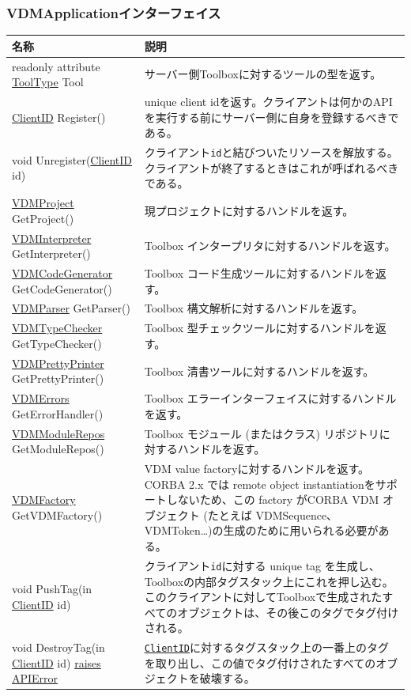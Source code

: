 \documentclass[\pformat,12pt]{jarticle}
\newcommand{\pbs}[1]{\let\temp=\\#1\let\\=\temp}
\newenvironment{interfacetable}{%
  \begin{longtable}{|>{\pbs\raggedright\ttfamily}p{6.6cm}%
                    |>{\pbs\raggedright}p{6.6cm}|} \hline
  \textrm{\bfseries 名称} &  \textbf{説明} \\ \hline
  \endhead
  }{\end{longtable}}
\newcommand{\APIError}{\hyperlink{exception.APIError}{raises APIError}}
\newcommand{\ToolType}{\hyperlink{type.ToolType}{ToolType}}
\newcommand{\VDMCodeGenerator}{\hyperlink{interface.VDMCodeGenerator}{VDMCodeGenerator}}
\newcommand{\VDMErrors}{\hyperlink{interface.VDMErrors}{VDMErrors}}
\newcommand{\VDMInterpreter}{\hyperlink{interface.VDMInterpreter}{VDMInterpreter}}
\newcommand{\VDMModuleRepos}{\hyperlink{interface.VDMModuleRepos}{VDMModuleRepos}}
\newcommand{\VDMFactory}{\hyperlink{interface.VDMFactory}{VDMFactory}}
\newcommand{\VDMParser}{\hyperlink{interface.VDMParser}{VDMParser}}
\newcommand{\VDMPrettyPrinter}{\hyperlink{interface.VDMPrettyPrinter}{VDMPrettyPrinter}}
\newcommand{\VDMProject}{\hyperlink{interface.VDMProject}{VDMProject}}
\newcommand{\VDMTypeChecker}{\hyperlink{interface.VDMTypeChecker}{VDMTypeChecker}}
\newcommand{\ClientID}{\hyperlink{type.ClientID}{ClientID}}
\begin{document}
\subsubsection{VDMApplicationインターフェイス}
\mbox{}
\begin{interfacetable}
readonly attribute {\ToolType} Tool
  & サーバー側Toolboxに対するツールの型を返す。
\\ \hline
{\ClientID} Register()
  & unique client idを返す。クライアントは何かのAPIを実行する前にサーバー側に自身を登録するべきである。
\\ \hline
void Unregister({\ClientID} id)
  & クライアント\texttt{id}と結びついたリソースを解放する。クライアントが終了するときはこれが呼ばれるべきである。
\\ \hline
{\VDMProject} GetProject()
  & 現プロジェクトに対するハンドルを返す。
\\ \hline
{\VDMInterpreter} GetInterpreter()
  &  Toolbox インタープリタに対するハンドルを返す。
\\ \hline
{\VDMCodeGenerator} GetCodeGenerator()
  & Toolbox コード生成ツールに対するハンドルを返す。
\\ \hline
{\VDMParser} GetParser()
  & Toolbox 構文解析に対するハンドルを返す。
\\ \hline
{\VDMTypeChecker} GetTypeChecker()
  & Toolbox 型チェックツールに対するハンドルを返す。
\\ \hline
{\VDMPrettyPrinter} GetPrettyPrinter()
  & Toolbox 清書ツールに対するハンドルを返す。
\\ \hline
{\VDMErrors} GetErrorHandler()
  & Toolbox エラーインターフェイスに対するハンドルを返す。
\\ \hline
{\VDMModuleRepos} GetModuleRepos()
  & Toolbox モジュール (またはクラス) リポジトリに対するハンドルを返す。
\\ \hline
{\VDMFactory} GetVDMFactory()
  & VDM value factoryに対するハンドルを返す。 CORBA 2.x では remote object instantiationをサポートしないため、この factory がCORBA VDM オブジェクト (たとえば VDMSequence、 VDMToken\ldots)の生成のために用いられる必要がある。
\\ \hline
void PushTag(in {\ClientID} id)
  & クライアント\texttt{id}に対する unique tag を生成し、Toolboxの内部タグスタック上にこれを押し込む。このクライアントに対してToolboxで生成されたすべてのオブジェクトは、その後このタグでタグ付けされる。
\\ \hline
void DestroyTag(in {\ClientID} id) \APIError
  & \texttt{{\ClientID}}に対するタグスタック上の一番上のタグを取り出し、この値でタグ付けされたすべてのオブジェクトを破壊する。
\\ \hline
\end{interfacetable}
\end{document}
